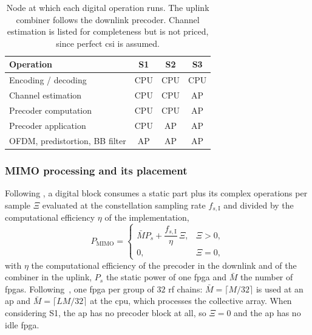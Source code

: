 \begin{table}[t]
\centering
\caption{Node at which each digital operation runs. The uplink combiner follows
the downlink precoder. Channel estimation is listed for completeness but is not
priced, since perfect \gls{csi} is assumed. }
\label{tab:split}
\begin{tabular}{@{}lccc@{}}
\toprule
Operation & S1 & S2 & S3 \\
\midrule
Encoding / decoding            & CPU & CPU & CPU \\
Channel estimation             & CPU & CPU & AP  \\
Precoder computation           & CPU & CPU & AP  \\
Precoder application           & CPU & AP  & AP  \\
OFDM, predistortion, BB filter & AP  & AP  & AP  \\
\bottomrule
\end{tabular}
\end{table}

\subsubsection{MIMO processing and its placement}
\label{sssec:mimo}
Following \cite{peschiera2026fr3}, a digital block consumes a static part plus
its complex operations per sample $\Xi$ evaluated at the constellation sampling
rate $f_{s,\mathrm{I}}$ and divided by the computational efficiency $\eta$ of
the implementation,
\begin{equation}
\label{eq:pmimo}
P_{\mathrm{MIMO}} =
\begin{cases}
\bar M P_{s} + \dfrac{f_{s,\mathrm{I}}}{\eta}\,\Xi, & \Xi > 0,\\[2mm]
0, & \Xi = 0,
\end{cases}
\end{equation}
with $\eta$ the computational efficiency of the precoder in the downlink and of
the combiner in the uplink, $P_{s}$ the static power of one \gls{fpga} and $\bar M$
the number of \glspl{fpga}. Following~\cite{peschiera2026fr3}, one \gls{fpga} per group of $32$ \gls{rf} chains: $\bar M=\lceil M/32\rceil$ is used at
an \gls{ap} and $\bar M=\lceil LM/32\rceil$ at the \gls{cpu}, which processes the collective array. When considering S1, the \gls{ap} has no precoder block at all, so $\Xi=0$ and the \gls{ap} has no idle \gls{fpga}. 

